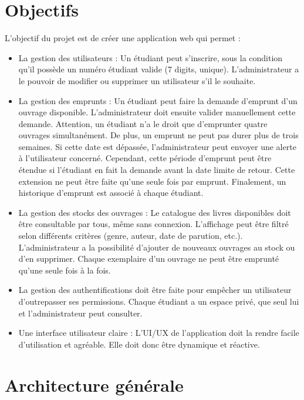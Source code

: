 \documentclass{article}%
\begin{document}

\section{Objectifs}

L'objectif du projet est de créer une application web qui permet :
\begin{itemize}
    \item La gestion des utilisateurs : Un étudiant peut s'inscrire, sous la condition qu'il possède un numéro étudiant valide (7 digits, unique). L'administrateur a le pouvoir de modifier ou supprimer un utilisateur s'il le souhaite. 
    \item La gestion des emprunts : Un étudiant peut faire la demande d'emprunt d'un ouvrage disponible. L'administrateur doit ensuite valider manuellement cette demande. Attention, un étudiant n'a le droit que d'emprunter quatre ouvrages simultanément. De plus, un emprunt ne peut pas durer plus de trois semaines. Si cette date est dépassée, l'administrateur peut envoyer une alerte à l'utilisateur concerné. Cependant, cette période d'emprunt peut être étendue si l'étudiant en fait la demande avant la date limite de retour. Cette extension ne peut être faite qu'une seule fois par emprunt. Finalement, un historique d'emprunt est associé à chaque étudiant.
    \item La gestion des stocks des ouvrages : Le catalogue des livres disponibles doit être consultable par tous, même sans connexion. L’affichage peut être filtré selon différents critères (genre, auteur, date de parution, etc.). L’administrateur a la possibilité d’ajouter de nouveaux ouvrages au stock ou d’en supprimer. Chaque exemplaire d’un ouvrage ne peut être emprunté qu’une seule fois à la fois.
    \item La gestion des authentifications doit être faite pour empêcher un utilisateur d'outrepasser ses permissions. Chaque étudiant a un espace privé, que seul lui et l'administrateur peut consulter. 
    \item Une interface utilisateur claire : L'UI/UX de l'application doit la rendre facile d'utilisation et agréable. Elle doit donc être dynamique et réactive.
\end{itemize}


\section{Architecture générale}
\end{document}
